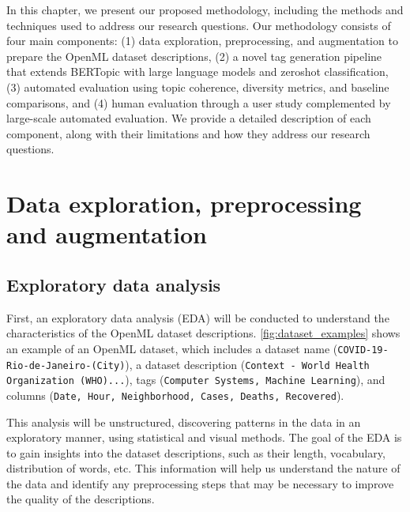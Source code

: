 \label{sec:methodology}
In this chapter, we present our proposed methodology, including the methods and techniques used to address our research questions. Our methodology consists of four main components: (1) data exploration, preprocessing, and augmentation to prepare the OpenML dataset descriptions, (2) a novel tag generation pipeline that extends BERTopic with large language models and zeroshot classification, (3) automated evaluation using topic coherence, diversity metrics, and baseline comparisons, and (4) human evaluation through a user study complemented by large-scale automated evaluation. We provide a detailed description of each component, along with their limitations and how they address our research questions.

\section{Data exploration, preprocessing and augmentation}
\subsection{Exploratory data analysis}
First, an exploratory data analysis (EDA) will be conducted to understand the characteristics of the OpenML dataset descriptions. \cref{fig:dataset_examples} shows an example of an OpenML dataset, which includes a dataset name (\texttt{COVID-19-Rio-de-Janeiro-(City)}), a dataset description (\texttt{Context - World Health Organization (WHO)...}), tags (\texttt{Computer Systems, Machine Learning}), and columns (\texttt{Date, Hour, Neighborhood, Cases, Deaths, Recovered}).

This analysis will be unstructured, discovering patterns in the data in an exploratory manner, using statistical and visual methods. The goal of the EDA is to gain insights into the dataset descriptions, such as their length, vocabulary, distribution of words, etc. This information will help us understand the nature of the data and identify any preprocessing steps that may be necessary to improve the quality of the descriptions.

